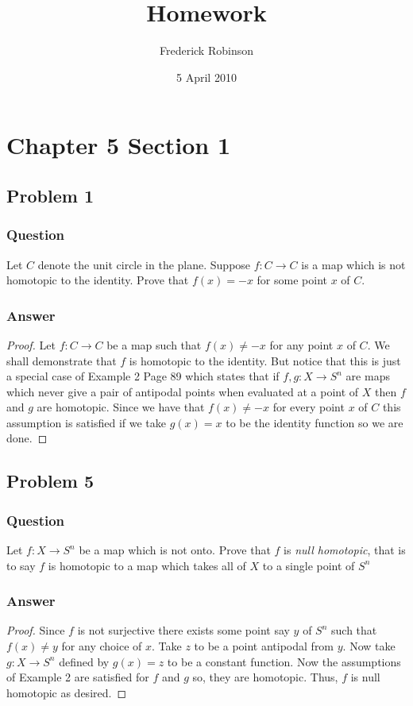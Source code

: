 \documentclass[10pt]{article}
\title{Homework}
\author{Frederick Robinson}
\date{5 April 2010}
\begin{document}

   \maketitle



\section{Chapter 5 Section 1}

\subsection{Problem 1}
\subsubsection{Question}
Let $C$ denote the unit circle in the plane. Suppose $f:C \to C$ is a map which is not homotopic to the identity. Prove that $f(x)=-x$ for some point $x$ of $C$.
\subsubsection{Answer}
\begin{proof}
Let $f:C \to C$ be a map such that  $f(x)\neq-x$ for any point $x$ of $C$. We shall demonstrate that $f$ is homotopic to the identity. But notice that this is just a special case of Example 2 Page 89 which states that if $f,g:X \to S^n$ are maps which never give a pair of antipodal points when evaluated at a point of $X$ then $f$ and $g$ are homotopic. Since we have that $f(x)\neq-x$ for every point $x$ of $C$ this assumption is satisfied if we take $g(x)=x$ to be the identity function so we are done.
\end{proof}

\subsection{Problem 5}
\subsubsection{Question}
Let $f:X \to S^n$ be a map which is not onto. Prove that $f$ is \emph{null homotopic}, that is to say $f$ is homotopic to a map which takes all of $X$ to a single point of $S^n$
\subsubsection{Answer}
\begin{proof}
Since $f$ is not surjective there exists some point say $y$ of $S^n$ such that $f(x) \neq y$ for any choice of $x$. Take $z$ to be a point antipodal from $y$. Now take $g: X \to S^n$ defined by $g(x)=z$ to be a constant function. Now the assumptions of Example 2 are satisfied for $f$ and $g$ so, they are homotopic. Thus, $f$ is null homotopic as desired.
\end{proof}
\end{document}
